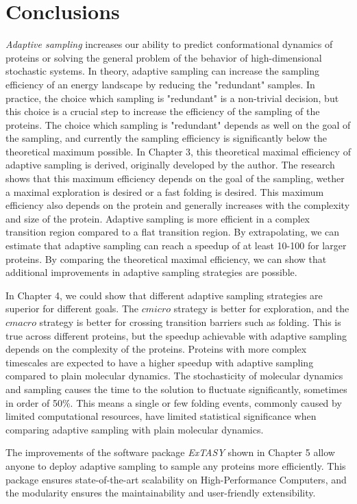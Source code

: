 \afterpage{\null\newpage}
\chapter{Conclusions}
\label{ch:conclude}
\emph{Adaptive sampling} increases our ability to predict conformational dynamics of proteins or solving the general problem of the behavior of high-dimensional stochastic systems. 
In theory, adaptive sampling can increase the sampling efficiency of an energy landscape by reducing the "redundant" samples. In practice, the choice which sampling is "redundant" is a non-trivial decision, but this choice is a crucial step to increase the efficiency of the sampling of the proteins. The choice which sampling is "redundant" depends as well on the goal of the sampling, and currently the sampling efficiency is significantly below the theoretical maximum possible. In Chapter 3, this theoretical maximal efficiency of adaptive sampling is derived, originally developed by the author. The research shows that this maximum efficiency depends on the goal of the sampling, wether a maximal exploration is desired or a fast folding is desired. This maximum efficiency also depends on the protein and generally increases with the complexity and size of the protein. Adaptive sampling is more efficient in a complex transition region compared to a flat transition region. By extrapolating, we can estimate that adaptive sampling can reach a speedup of at least 10-100 for larger proteins. By comparing the theoretical maximal efficiency, we can show that additional improvements in adaptive sampling strategies are possible.

In Chapter 4, we could show that different adaptive sampling strategies are superior for different goals. The $cmicro$ strategy is better for exploration, and the $cmacro$ strategy is better for crossing transition barriers such as folding. This is true across different proteins, but the speedup achievable with adaptive sampling depends on the complexity of the proteins. Proteins with more complex timescales are expected to have a higher speedup with adaptive sampling compared to plain molecular dynamics. The stochasticity of molecular dynamics and sampling causes the time to the solution to fluctuate significantly, sometimes in order of 50\%. This means a single or few folding events, commonly caused by limited computational resources, have limited statistical significance when comparing adaptive sampling with plain molecular dynamics.

The improvements of the software package \emph{ExTASY} shown in Chapter 5 allow anyone to deploy adaptive sampling to sample any proteins more efficiently. This package ensures state-of-the-art scalability on High-Performance Computers, and the modularity ensures the maintainability and user-friendly extensibility.

